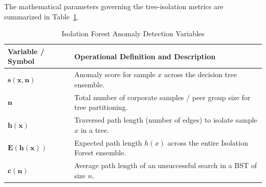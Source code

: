 The mathematical parameters governing the tree-isolation metrics are summarized in Table~\ref{tab:glossary_isolation}.

\begin{table}[H]
    \centering
    \renewcommand{\arraystretch}{0.85}
    \caption{Isolation Forest Anomaly Detection Variables}
    \label{tab:glossary_isolation}
    \footnotesize
    \begin{tabularx}{\textwidth}{lX}
        \toprule
        \textbf{Variable / Symbol} & \textbf{Operational Definition and Description} \\
        \midrule
        $\mathbf{s(x, n)}$ & Anomaly score for sample $x$ across the decision tree ensemble. \\
        $\mathbf{n}$ & Total number of corporate samples / peer group size for tree partitioning. \\
        $\mathbf{h(x)}$ & Traversed path length (number of edges) to isolate sample $x$ in a tree. \\
        $\mathbf{E(h(x))}$ & Expected path length $h(x)$ across the entire Isolation Forest ensemble. \\
        $\mathbf{c(n)}$ & Average path length of an unsuccessful search in a BST of size $n$. \\
        \bottomrule
    \end{tabularx}
\end{table}

